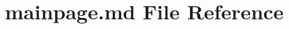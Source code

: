 \hypertarget{docs_2mainpage_8md}{}\section{mainpage.\+md File Reference}
\label{docs_2mainpage_8md}
